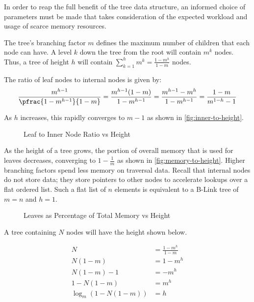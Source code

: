

In order to reap the full benefit of the tree data structure, an informed choice
of parameters must be made that takes consideration of the expected workload and
usage of scarce memory resources.

The tree's branching factor $m$ defines the maximum number of children that each
node can have. A level $k$ down the tree from the root will contain $m^k$ nodes.
Thus, a tree of height $h$ will contain
$\sum_{k=1}^h m^k = \frac{1-m^h}{1-m}$ nodes.

The ratio of leaf nodes to internal nodes is given by:
$$
	\frac{m^{h-1}}{\pfrac{1-m^{h-1}}{1-m}}
	= \frac{m^{h-1}(1-m)}{1-m^{h-1}}
	= \frac{m^{h-1}-m^{h}}{1-m^{h-1}}
	= \frac{1-m}{m^{1-h} - 1}
$$

As $h$ increases, this rapidly converges to $m-1$ as shown in
\autoref{fig:inner-to-height}.

\begin{figure}
	\centering
	
	\caption{Leaf to Inner Node Ratio vs Height}
	\label{fig:inner-to-height}
\end{figure}

As the height of a tree grows, the portion of overall memory that is used for
leaves decreases, converging to $1-\frac{1}{m}$ as shown in
\autoref{fig:memory-to-height}. Higher branching factors spend less memory on
traversal data. Recall that internal nodes do not store data; they store
pointers to other nodes to accelerate lookups over a flat ordered list. Such a
flat list of $n$ elements is equivalent to a B-Link tree of $m=n$ and $h=1$.

\begin{figure}
	\centering
	
	\caption{Leaves as Percentage of Total Memory vs Height}
	\label{fig:memory-to-height}
\end{figure}

A tree containing $N$ nodes will have the height shown below.

\begin{align*}
	N &= \frac{1-m^h}{1-m} \\
	N (1-m) &= 1-m^h \\
	N (1-m) - 1 &= -m^h \\
	1 - N (1-m) &= m^h \\
	\log_m\left(1 - N (1-m)\right) &= h
\end{align*}

